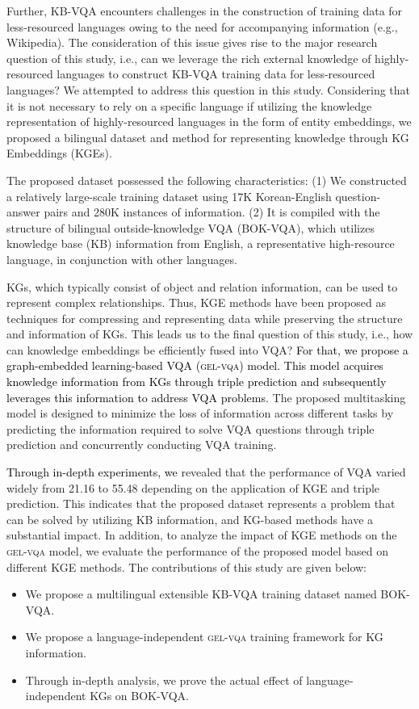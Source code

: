 \documentclass[letterpaper]{article} %
\newcommand{\kt}[1]{\textcolor{black}{#1}}
\begin{document}
Further, KB-VQA encounters challenges in the construction of training data for less-resourced languages owing to the need for accompanying information (e.g., Wikipedia). The consideration of this issue gives rise to the major research question of this study, i.e., can we leverage the rich external knowledge of highly-resourced languages to construct KB-VQA training data for less-resourced languages? We attempted to address this question in this study. Considering that it is not necessary to rely on a specific language if utilizing the knowledge representation of highly-resourced languages in the form of entity embeddings, we proposed a bilingual dataset and method for representing knowledge through KG Embeddings (KGEs).

The proposed dataset possessed the following characteristics: (1) We constructed a relatively large-scale training dataset using 17K Korean-English question-answer pairs and 280K instances of information. (2) It is compiled with the structure of bilingual outside-knowledge VQA (BOK-VQA), which utilizes knowledge base (KB) information from English, a representative high-resource language, in conjunction with other languages.

KGs, which typically consist of object and relation information, can be used to represent complex relationships. Thus, KGE methods \cite{rescal,transE,kge, complEX, ConvE, rotatE} have been proposed as techniques for compressing and representing data while preserving the structure and information of KGs.
This leads us to the final question of this study, i.e., how can knowledge embeddings be efficiently fused into VQA? \kt{For that, we propose a graph-embedded learning-based VQA (\textsc{gel-vqa}) model. This model acquires knowledge information from KGs through triple prediction and subsequently leverages this information to address VQA problems.}
The proposed multitasking model is designed to minimize the loss of information across different tasks by predicting the information required to solve VQA questions through triple prediction and concurrently conducting VQA training.

\kt{Through in-depth experiments, we} revealed that the performance of VQA varied widely from 21.16 to 55.48 depending on the application of KGE and triple prediction. This indicates that the proposed dataset represents a problem that can be solved by utilizing KB information, and KG-based methods have a substantial impact. In addition, to analyze the impact of KGE methods on the \textsc{gel-vqa} model, we evaluate the performance of the proposed model based on different KGE methods. The contributions of this study are given below:
\begin{itemize}
\item We propose a multilingual extensible KB-VQA training dataset named BOK-VQA.
\item We propose a language-independent \textsc{gel-vqa} training framework for KG information.
\item Through in-depth analysis, we prove the actual effect of language-independent KGs on BOK-VQA.
\end{itemize}
\end{document}

